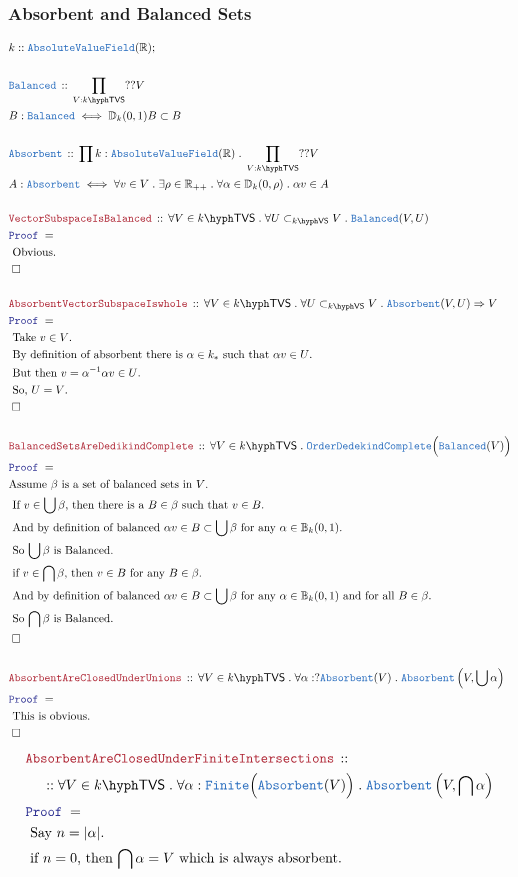 \documentclass[12pt]{scrartcl}
\newcommand{\TYPE}[1]{\textcolor{NavyBlue}{\mathtt{#1}}}
\newcommand{\LOGIC}[1]{\textcolor{Blue}{\mathtt{#1}}}
\newcommand{\THM}[1]{\textcolor{Maroon}{\mathtt{#1}}}
\renewcommand{\.}{\; . \;}
\newcommand{\Theorem}[2]{& \THM{#1} \, :: \, #2 \\ & \Proof = \\ }
\newcommand{\DeclareType}[2]{& \TYPE{#1} \, :: \, #2 \\}
\newcommand{\DefineType}[3]{& #1 : \TYPE{#2} \iff #3 \\}
\newcommand{\NewLine}{\\ & \kern 1pc}
\newcommand{\Page}[1]{ \begin{align*} #1 \end{align*}   }
\newcommand{\Explain}[1]{& \text{#1.} \\}
\newcommand{\Imply}{\Rightarrow}
\newcommand{\Reals}{\mathbb{R} }
\newcommand{\Finite}{\TYPE{Finite}}
\newcommand{\QED}{\; \square}
\newcommand{\EndProof}{& \QED \\}
\newcommand{\Proof}{\LOGIC{Proof} \; }
\newcommand{\Cell}{\mathbb{B}}
\newcommand{\Disc}{\mathbb{D}}
\newcommand{\VS}[1]{#1\hyph\mathsf{VS}} %
\newcommand{\OComplete}{\TYPE{OrderDedekindComplete}}
\newcommand{\AVF}{\TYPE{AbsoluteValueField}}
\newcommand{\TVS}[1]{{#1}\hyph\mathsf{TVS}}
\begin{document}
\subsubsection{Absorbent and Balanced Sets}
\Page{
	& k :: \AVF(\Reals) ;\\
	\\
	\DeclareType{Balanced}{ \prod_{V : \TVS{k} } ??V }
	\DefineType{B}{Balanced}{\Disc_k(0,1)B \subset B}
	\\
	\DeclareType{Absorbent}{\prod k : \AVF(\Reals) \. \prod_{V : \TVS{k} } ??V }
	\DefineType{A}{Absorbent}{
		\forall v \in V \. 
		\exists \rho \in \Reals_{++} \. 
		\forall \alpha \in \Disc_k(0,\rho) \.
		\alpha v \in A
	}
	\\
	\Theorem{VectorSubspaceIsBalanced}
	{
		\forall V \in \TVS{k} \.
		\forall U \subset_{\VS{k}} V \.
		\TYPE{Balanced}(V,U)
	}
	\Explain{ Obvious}
	\EndProof
	\\
	\Theorem{AbsorbentVectorSubspaceIswhole}
	{
		\forall V \in \TVS{k} \.
		\forall U \subset_{\VS{k}} V \.
		\TYPE{Absorbent}(V,U) \Imply V
	}
	\Explain{ Take $v \in V$}
	\Explain{ By definition of absorbent there is $\alpha \in k_*$ such that $\alpha v \in U$}
	\Explain{ But then  $ v = \alpha^{-1} \alpha v \in U$}
	\Explain{ So, $U = V$}
	\EndProof
	\\
	\Theorem{BalancedSetsAreDedikindComplete}
	{
		\forall V \in \TVS{k} \. \OComplete\Big( \TYPE{Balanced}(V)\Big)
	}
	\Explain{Assume $\beta$ is a set of balanced sets in $V$}
	\Explain{ If $v \in \bigcup \beta$, then there is a $B \in \beta$ such that $v \in B$}
	\Explain{ 
	And by definition of balanced $\alpha v \in B \subset \bigcup \beta $ 
	for any $\alpha \in \Cell_k(0,1)$}
	\Explain{
		So $\bigcup \beta$ is Balanced}
	\Explain{ if $v \in \bigcap \beta$, then $v \in B$ for any $B \in \beta$}
	\Explain{ 
	And by definition of balanced $\alpha v \in B \subset \bigcup \beta $ 
	for any $\alpha \in \Cell_k(0,1)$ and for all $B \in \beta$}
	\Explain{
		So $\bigcap \beta$ is Balanced}
	\EndProof
	\\
	\Theorem{AbsorbentAreClosedUnderUnions}
	{
		\forall V \in \TVS{k} \. \forall \alpha : ?\TYPE{Absorbent}(V) \. 
		\TYPE{Absorbent}\left(V,\bigcup\alpha \right)
	}
	\Explain{  This is obvious}
	\EndProof
}\Page{
	\Theorem{AbsorbentAreClosedUnderFiniteIntersections}
	{
		\NewLine ::		
		\forall V \in \TVS{k} \. \forall \alpha : \Finite\Big(\TYPE{Absorbent}(V)\Big) \. 
		\TYPE{Absorbent}\left(V,\bigcap\alpha \right)
	}
	\Explain{  Say $n = |\alpha|$}
	\Explain{ if $n = 0$, then $\bigcap \alpha = V$ which is always absorbent}
}
\end{document}

